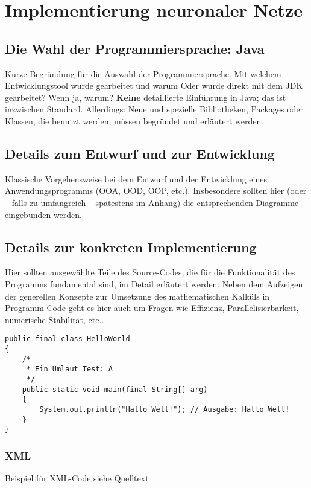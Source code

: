 \chapter{Implementierung neuronaler Netze}
\label{chap:implementierung}

\section{Die Wahl der Programmiersprache: Java}
Kurze Begründung für die Auswahl der Programmiersprache. Mit welchem
Entwicklungstool wurde gearbeitet und warum Oder wurde direkt mit dem JDK 
gearbeitet? Wenn ja, warum? {\bf Keine} detaillierte
Einführung in Java; das ist inzwischen Standard. Allerdings: Neue und
spezielle Bibliotheken, Packages oder Klassen, die benutzt werden, müssen
begründet und erläutert werden.

\section{Details zum Entwurf und zur Entwicklung}
Klassische Vorgehensweise bei dem Entwurf und der Entwicklung eines
Anwendungsprogramms (OOA, OOD, OOP, etc.). 
Insbesondere sollten hier (oder -- falls zu umfangreich -- spätestens im
Anhang) die entsprechenden Diagramme eingebunden werden.

\section{Details zur konkreten Implementierung}
Hier sollten ausgewählte Teile des Source-Codes, die für die Funktionalität
des Programms fundamental sind, im Detail erläutert werden. Neben dem
Aufzeigen der generellen Konzepte zur Umsetzung des mathematischen Kalküls in
Programm-Code geht es hier auch um Fragen wie Effizienz, Parallelisierbarkeit,
numerische Stabilität, etc.. 

\begin{lstlisting}[firstnumber=1, caption={[Hallo-Welt-Programm (Java)] Ein Hallo-Welt-Programm in der Programmiersprache Java.}, label=lst:hallo_welt, style=java]
public final class HelloWorld
{
    /*
     * Ein Umlaut Test: Ä
     */
	public static void main(final String[] arg)
	{
		System.out.println("Hallo Welt!"); // Ausgabe: Hallo Welt!
	}
}
\end{lstlisting}
\subsection{XML}
Beispiel für XML-Code siehe Quelltext

